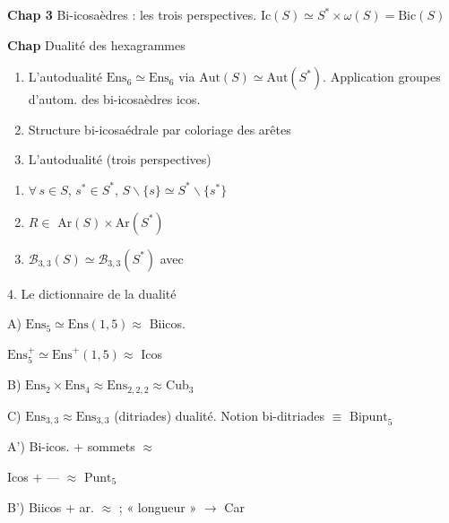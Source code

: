 \documentclass[11pt,a4paper]{article}
\begin{document}
\textbf{Chap 3} Bi-icosaèdres : les trois perspectives. \struck{\ill{}} $\mathrm{Ic}(S) \simeq S^* \times \omega(S) = \mathrm{Bic}(S)$

\textbf{Chap} \struck{\ill{}} Dualité des hexagrammes


\begin{enumerate}
  \item L'autodualité $\mathrm{Ens}_6 \simeq \mathrm{Ens}_6$  via $\mathrm{Aut}(S) \simeq \mathrm{Aut}(S^*)$. Application  groupes d'autom. des bi-icosaèdres \struck{\ill{}}  icos.
  \item Structure bi-icosaédrale par coloriage des arêtes
  \item L'autodualité (trois perspectives)
\end{enumerate}
\begin{enumerate}
    \item[a)] $\forall\, s \in S$, $s^* \in S^*$, $S \smallsetminus \{s\} \simeq S^* \smallsetminus \{s^*\}$
    \item[b)] $R \in$ \struck{\ill{}} $\mathrm{Ar}(S) \times \mathrm{Ar}(S^*)$
    \item[c)] $\mathcal{B}_{3,3}(S) \simeq \mathcal{B}_{3,3}(S^*)$ avec 
\end{enumerate}

4. Le dictionnaire de la dualité

A)  $\mathrm{Ens}_5 \simeq \mathrm{Ens}(1,5) \approx$ Biicos.

\quad $\mathrm{Ens}_5^+ \simeq \mathrm{Ens}^+(1,5) \approx$ Icos

B) $\mathrm{Ens}_2 \times \mathrm{Ens}_4 \approx \mathrm{Ens}_{2,2,2} \approx \mathrm{Cub}_3$

C) $\mathrm{Ens}_{3,3} \approx \mathrm{Ens}_{3,3}$ (ditriades) dualité. Notion bi-ditriades $\equiv$ $\mathrm{Bipunt}_5$


A') Bi-icos. + sommets $\approx$ \struck{\ill{}}

\quad Icos + — $\approx$ \struck{\ill{}} $\mathrm{Punt}_5$

B') Biicos + ar. $\approx$  ; « longueur »  $\to$ Car

\end{document}
